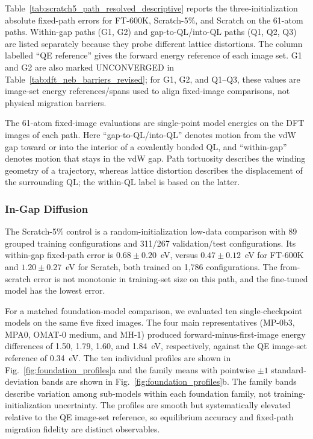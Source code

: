 \documentclass[pdflatex,sn-mathphys-num]{sn-jnl}%
\theoremstyle{thmstyleone}%
\theoremstyle{thmstyletwo}%
\theoremstyle{thmstylethree}%
\begin{document}
Table~\ref{tab:scratch5_path_resolved_descriptive} reports the three-initialization absolute fixed-path errors for FT-600K, Scratch-5\%, and Scratch on the 61-atom paths. Within-gap paths (G1, G2) and gap-to-QL/into-QL paths (Q1, Q2, Q3) are listed separately because they probe different lattice distortions. The column labelled ``QE reference'' gives the forward energy reference of each image set. G1 and G2 are also marked UNCONVERGED in Table~\ref{tab:dft_neb_barriers_revised}; for G1, G2, and Q1--Q3, these values are image-set energy references/spans used to align fixed-image comparisons, not physical migration barriers.


The 61-atom fixed-image evaluations are single-point model energies on the DFT images of each path. Here ``gap-to-QL/into-QL'' denotes motion from the vdW gap toward or into the interior of a covalently bonded QL, and ``within-gap'' denotes motion that stays in the vdW gap. Path tortuosity describes the winding geometry of a trajectory, whereas lattice distortion describes the displacement of the surrounding QL; the within-QL label is based on the latter.

\subsubsection{In-Gap Diffusion}
The Scratch-5\% control is a random-initialization low-data comparison with 89 grouped training configurations and 311/267 validation/test configurations. Its within-gap fixed-path error is $0.68 \pm 0.20$~eV, versus $0.47 \pm 0.12$~eV for FT-600K and $1.20 \pm 0.27$~eV for Scratch, both trained on 1,786 configurations. The from-scratch error is not monotonic in training-set size on this path, and the fine-tuned model has the lowest error.

For a matched foundation-model comparison, we evaluated ten single-checkpoint models on the same five fixed images. The four main representatives (MP-0b3, MPA0, OMAT-0 medium, and MH-1) produced forward-minus-first-image energy differences of 1.50, 1.79, 1.60, and 1.84~eV, respectively, against the QE image-set reference of 0.34~eV. The ten individual profiles are shown in Fig.~\ref{fig:foundation_profiles}a and the family means with pointwise $\pm1$ standard-deviation bands are shown in Fig.~\ref{fig:foundation_profiles}b. The family bands describe variation among sub-models within each foundation family, not training-initialization uncertainty. The profiles are smooth but systematically elevated relative to the QE image-set reference, so equilibrium accuracy and fixed-path migration fidelity are distinct observables.
\end{document}
